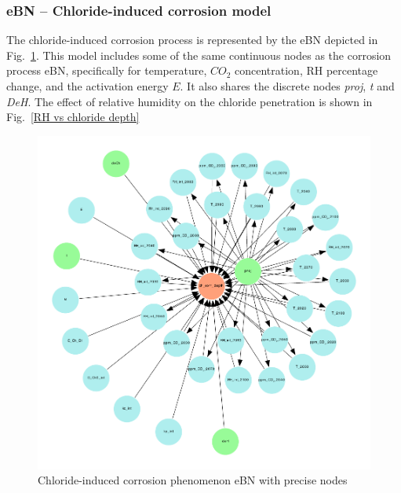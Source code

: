 \subsubsection{eBN -- Chloride-induced corrosion model}\label{ebn_chloride_section}
The chloride-induced corrosion process is represented by the eBN depicted in Fig.~\ref{chloride_ebn}. This model includes some of the same continuous nodes as the corrosion process eBN, specifically for temperature, $CO_2$ concentration, RH percentage change, and the activation energy $E$. It also shares the  discrete nodes \textit{proj}, \textit{t} and \textit{DeH}. The effect of relative humidity on the chloride penetration is shown in Fig.~\ref{RH vs chloride depth}
\begin{figure}[H]
    \centering
    \includegraphics[width=\linewidth]{imgs/pdfs/9_chloride_ebn.pdf}
    \caption{Chloride-induced corrosion phenomenon eBN with precise nodes}\label{chloride_ebn}
\end{figure}
